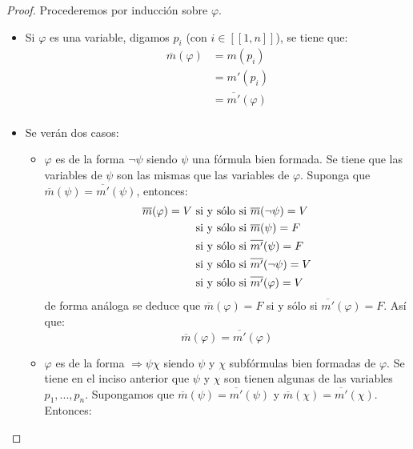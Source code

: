 \documentclass[12pt]{report}
\newcounter{it}
\theoremstyle{largebreak}
\newcommand\natint[1]{\ensuremath{\left[\!\left[ #1\right]\!\right]}}
\begin{document}
    \begin{proof}
        Procederemos por inducción sobre $\varphi$.
        \begin{itemize}
            \item Si $\varphi$ es una variable, digamos $p_i$ (con $i\in\natint{1,n}$), se tiene que:
            \begin{equation*}
                \begin{split}
                    \overline{m}(\varphi)&=m(p_i)\\
                    &=m'(p_i)\\
                    &=\overline{m'}(\varphi)\\
                \end{split}
            \end{equation*}
            \item Se verán dos casos:
            \begin{itemize}
                \item $\varphi$ es de la forma $\neg\psi$ siendo $\psi$ una fórmula bien formada. Se tiene que las variables de $\psi$ son las mismas que las variables de $\varphi$. Suponga que $\overline{m}(\psi)=\overline{m'}(\psi)$, entonces:
                \begin{equation*}
                    \begin{split}
                        \overline{m}(\varphi)=V & \textup{ si y sólo si }\overline{m}(\neg\psi)=V\\
                        &\textup{ si y sólo si }\overline{m}(\psi)=F\\
                        &\textup{ si y sólo si }\overline{m'}(\psi)=F\\
                        &\textup{ si y sólo si }\overline{m'}(\neg\psi)=V\\
                        &\textup{ si y sólo si }\overline{m'}(\varphi)=V\\
                    \end{split}
                \end{equation*}
                de forma análoga se deduce que $\overline{m}(\varphi)=F$ si y sólo si $\overline{m'}(\varphi)=F$. Así que:
                \begin{equation*}
                    \overline{m}(\varphi)=\overline{m'}(\varphi)
                \end{equation*}
                \item $\varphi$ es de la forma $\Rightarrow\psi\chi$ siendo $\psi$ y $\chi$ subfórmulas bien formadas de $\varphi$. Se tiene en el inciso anterior que $\psi$ y $\chi$ son tienen algunas de las variables $p_1,...,p_n$. Supongamos que $\overline{m}(\psi)=\overline{m'}(\psi)$ y $\overline{m}(\chi)=\overline{m'}(\chi)$. Entonces:

\end{itemize}
\end{itemize}
\end{proof}
\end{document}
